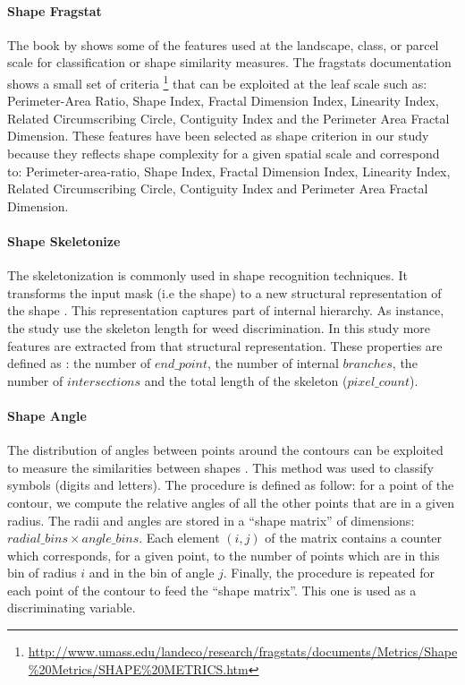 \documentclass[../thesis.tex]{subfiles}
\begin{document}
    \paragraph{Shape Fragstat} The book by \cite{mcgarigal1995spatial} shows some of the features used at the landscape, class, or parcel scale for classification or shape similarity measures. The fragstats documentation shows a small set of criteria \footnote{\url{http://www.umass.edu/landeco/research/fragstats/documents/Metrics/Shape\%20Metrics/SHAPE\%20METRICS.htm}} that can be exploited at the leaf scale such as: Perimeter-Area Ratio, Shape Index, Fractal Dimension Index, Linearity Index, Related Circumscribing Circle, Contiguity Index and the Perimeter Area Fractal Dimension. These features have been selected as shape criterion in our study because they reflects shape complexity for a given spatial scale and correspond to: Perimeter-area-ratio, Shape Index, Fractal Dimension Index, Linearity Index, Related Circumscribing Circle, Contiguity Index and Perimeter Area Fractal Dimension.
    
    \paragraph{Shape Skeletonize} The skeletonization is commonly used in shape recognition techniques. It transforms the input mask (i.e the shape) to a new structural representation of the shape \cite{ERDEM20102024}. This representation captures part of internal hierarchy. As instance, the \cite{Lottes2016} study use the skeleton length for weed discrimination. In this study more features are extracted from that structural representation. These properties are defined as : the number of $end\_ point$, the number of internal $branches$, the number of $intersections$ and the total length of the skeleton ($pixel\_count$).
    
    \paragraph{Shape Angle} The distribution of angles between points around the contours can be exploited to measure the similarities between shapes \cite{belongie2002shape}. This method was used to classify symbols (digits and letters). The procedure is defined as follow: for a point of the contour, we compute the relative angles of all the other points that are in a given radius. The radii and angles are stored in a ``shape matrix'' of dimensions: $radial\_bins \times angle\_bins$. Each element $(i,j)$ of the matrix contains a counter which corresponds, for a given point, to the number of points which are in this bin of radius $i$ and in the bin of angle $j$. Finally, the procedure is repeated for each point of the contour to feed the ``shape matrix''. This one is used as a discriminating variable.
    
\end{document}
